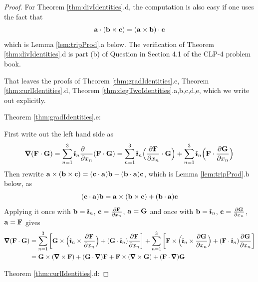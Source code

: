 \begin{proof}
For Theorem \ref{thm:divIdentities}.d, the computation is also easy if 
one uses the fact that  
\begin{equation*}
\mathbf{a}\cdot(\mathbf{b}\times\mathbf{c})=(\mathbf{a}\times\mathbf{b})\cdot\mathbf{c}
\end{equation*} 
which is Lemma \ref{lem:tripProd}.a below. The verification of 
Theorem \ref{thm:divIdentities}.d is part (b) of 
Question  in Section 4.1 of the CLP-4 problem book.

\bigskip
\noindent That leaves the proofs of 
       Theorem \ref{thm:gradIdentities}.e,
       Theorem \ref{thm:curlIdentities}.d,
       Theorem \ref{thm:degTwoIdentities}.a,b,c,d,e, 
which we write out explicitly.

\bigskip
\noindent Theorem \ref{thm:gradIdentities}.e:

First write out the left hand side as
\begin{align*}
\vnabla(\vF\cdot\vG)
=\sum_{n=1}^3\hi_n\frac{\partial\hfill}{\partial x_n}(\vF\cdot\vG)
=\sum_{n=1}^3\hi_n\Big(\frac{\partial\vF}{\partial x_n}\cdot\vG\Big)
+\sum_{n=1}^3\hi_n\Big(\vF\cdot\frac{\partial\vG}{\partial x_n}\Big)
\end{align*}
Then rewrite $\mathbf{a}\times(\mathbf{b}\times\mathbf{c})=(\mathbf{c}\cdot\mathbf{a})\mathbf{b}-(\mathbf{b}\cdot\mathbf{a})\mathbf{c}$,
which is Lemma \ref{lem:tripProd}.b below, as 
\begin{equation*}
(\mathbf{c}\cdot\mathbf{a})\mathbf{b}=\mathbf{a}\times(\mathbf{b}\times\mathbf{c})+(\mathbf{b}\cdot\mathbf{a})\mathbf{c}
\end{equation*}
Applying it once with 
$\mathbf{b}=\hat{\pmb{\imath}}_n$, $\mathbf{c}=\frac{\partial\mathbf{F}}{\partial x_n}$, $\mathbf{a}=\mathbf{G}$ and once with
$\mathbf{b}=\hat{\pmb{\imath}}_n$, $\mathbf{c}=\frac{\partial\mathbf{G}}{\partial x_n}$, $\mathbf{a}=\mathbf{F}$ gives
\begin{align*}
\vnabla(\vF\cdot\vG)
&=\sum_{n=1}^3\bigg[
     \vG\times\Big(\hi_n\times\frac{\partial\vF}{\partial x_n}\Big)
     +(\vG\cdot\hi_n)\frac{\partial\vF}{\partial x_n}\bigg]
+\sum_{n=1}^3\bigg[
     \vF\times\Big(\hi_n\times\frac{\partial\vG}{\partial x_n}\Big)
     +(\vF\cdot\hi_n)\frac{\partial\vG}{\partial x_n}\bigg] \\
&=\vG\times(\vnabla\times\vF) +(\vG\cdot\vnabla)\vF
  +\vF\times(\vnabla\times\vG) +(\vF\cdot\vnabla)\vG
\end{align*}



\bigskip
\noindent Theorem \ref{thm:curlIdentities}.d:


\end{proof}
